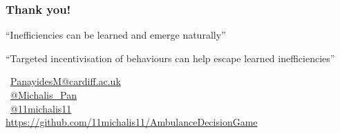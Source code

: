 \begin{frame}
    \frametitle{Thank you!}
    \centering

    \large
    ``Inefficiencies can be learned and emerge naturally''

    \vspace{0.5cm}

    ``Targeted incentivisation of behaviours can help escape learned inefficiencies''

    \vspace{1.5cm}
    \faEnvelope \, \url{PanayidesM@cardiff.ac.uk} \\
    \faTwitterSquare \, \url{@Michalis_Pan} \\
    \faGithubSquare \, \url{@11michalis11} \\
    \small{\url{https://github.com/11michalis11/AmbulanceDecisionGame}}

\end{frame}


